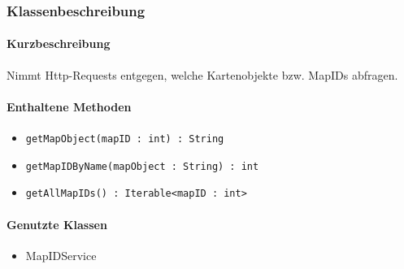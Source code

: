 \subsubsection*{Klassenbeschreibung}%
\paragraph*{Kurzbeschreibung}
Nimmt Http-Requests entgegen, welche Kartenobjekte bzw. MapIDs abfragen.
\paragraph*{Enthaltene Methoden}
\begin{itemize}
    \item \texttt{getMapObject(mapID : int) : String}
    \item \texttt{getMapIDByName(mapObject : String) : int}
    \item \texttt{getAllMapIDs() : Iterable<mapID : int>}
\end{itemize}
\paragraph*{Genutzte Klassen}
\begin{itemize}
    \item MapIDService
\end{itemize}
